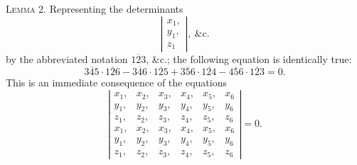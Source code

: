 \documentclass[11pt]{article}
\begin{document}
\smallskip

\noindent\textsc{Lemma 2.} Representing the determinants
\[
\left|\begin{array}{c} x_1, \\ y_1, \\ z_1 \end{array}\right|,\ \&\text{c.}
\]
by the abbreviated notation $\overline{123}$, \&c.; the following equation is identically true:
\[
\overline{345}\cdot\overline{126} - \overline{346}\cdot\overline{125} + \overline{356}\cdot\overline{124} - \overline{456}\cdot\overline{123} = 0.
\]
This is an immediate consequence of the equations
\[
\left|\begin{array}{cccccc}
x_1, & x_2, & x_3, & x_4, & x_5, & x_6 \\
y_1, & y_2, & y_3, & y_4, & y_5, & y_6 \\
z_1, & z_2, & z_3, & z_4, & z_5, & z_6 \\
x_1, & x_2, & x_3, & x_4, & x_5, & x_6 \\
y_1, & y_2, & y_3, & y_4, & y_5, & y_6 \\
z_1, & z_2, & z_3, & z_4, & z_5, & z_6
\end{array}\right| = 0.
\]
\end{document}
